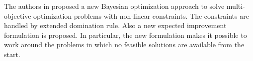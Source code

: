 \begin{longtable}{|p{6cm}|p{3cm}|p{2.5cm}|p{2cm}|}

\label{tab:1}
\end{longtable}
The authors in \cite{feliot2017bayesian}  proposed a new Bayesian optimization approach to solve multi-objective optimization
problems with non-linear constraints. The constraints are handled by extended domination rule. Also a new expected improvement formulation is proposed. In particular, the new formulation makes it possible to work around the problems in which no feasible solutions are available from the start. 
